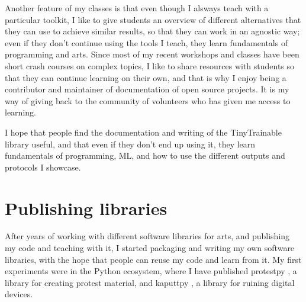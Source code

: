 Another feature of my classes is that even though I alsways teach with a particular toolkit, I like to give students an overview of different alternatives that they can use to achieve similar results, so that they can work in an agnostic way; even if they don't continue using the tools I teach, they learn fundamentals of programming and arts. Since most of my recent workshops and classes have been short crash courses on complex topics, I like to share resources with students so that they can continue learning on their own, and that is why I enjoy being a contributor and maintainer of documentation of open source projects. It is my way of giving back to the community of volunteers who has given me access to learning.

I hope that people find the documentation and writing of the TinyTrainable library useful, and that even if they don't end up using it, they learn fundamentals of programming, \acrshort{ML}, and how to use the different outputs and protocols I showcase.

\section{Publishing libraries}

After years of working with different software libraries for arts, and publishing my code and teaching with it, I started packaging and writing my own software libraries, with the hope that people can reuse my code and learn from it. My first experiments were in the Python ecosystem, where I have published protestpy \cite{website-pypi-protestpy}, a library for creating protest material, and kaputtpy \cite{website-pypi-kaputtpy}, a library for ruining digital devices.

